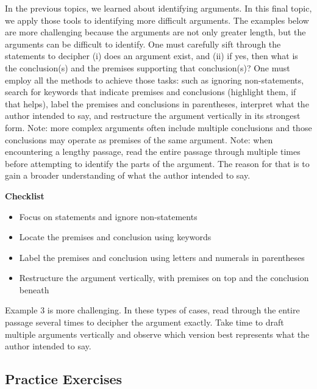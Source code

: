 \documentclass[
]{book}
\providecommand{\tightlist}{%
  \setlength{\itemsep}{0pt}\setlength{\parskip}{0pt}}
\begin{document}
\begin{reflect}
In the previous topics, we learned about identifying arguments. In this final topic, we apply those tools to identifying more difficult arguments. The examples below are more challenging because the arguments are not only greater length, but the arguments can be difficult to identify. One must carefully sift through the statements to decipher (i) does an argument exist, and (ii) if yes, then what is the conclusion(s) and the premises supporting that conclusion(s)? One must employ all the methods to achieve those tasks: such as ignoring non-statements, search for keywords that indicate premises and conclusions (highlight them, if that helps), label the premises and conclusions in parentheses, interpret what the author intended to say, and restructure the argument vertically in its strongest form. Note: more complex arguments often include multiple conclusions and those conclusions may operate as premises of the same argument. Note: when encountering a lengthy passage, read the entire passage through multiple times before attempting to identify the parts of the argument. The reason for that is to gain a broader understanding of what the author intended to say.

\textbf{Checklist}

\begin{itemize}
\tightlist
\item
  Focus on statements and ignore non-statements
\item
  Locate the premises and conclusion using keywords
\item
  Label the premises and conclusion using letters and numerals in parentheses
\item
  Restructure the argument vertically, with premises on top and the conclusion beneath
\end{itemize}

Example 3 is more challenging. In these types of cases, read through the entire passage several times to decipher the argument exactly. Take time to draft multiple arguments vertically and observe which version best represents what the author intended to say.
\end{reflect}

\hypertarget{practice-exercises-1}{%
\subsection*{Practice Exercises}\label{practice-exercises-1}}
\end{document}
